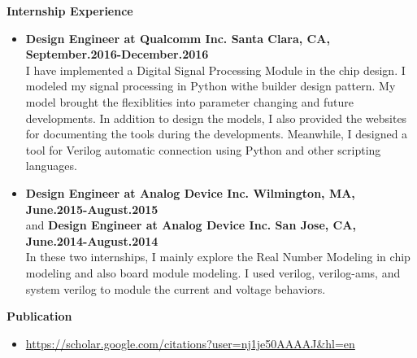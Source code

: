 \documentclass[]{article}
\begin{document}
\noindent \textbf{Internship Experience}
    \begin{itemize}
		\item \textbf{Design Engineer at Qualcomm Inc. Santa Clara, CA, September.2016-December.2016}\\
I have implemented a Digital Signal Processing Module in the chip design. I modeled my signal processing
in Python withe builder design pattern. My model brought the flexiblities into parameter changing and 
future developments. In addition to design the models, I also provided the websites for documenting the
tools during the developments. Meanwhile, I designed a tool for Verilog automatic connection using Python 
and other scripting languages.
        \item \textbf{Design Engineer at Analog Device Inc. Wilmington, MA, June.2015-August.2015}\\
        and \textbf{Design Engineer at Analog Device Inc. San Jose, CA, June.2014-August.2014}\\
In these two internships, I mainly explore the Real Number Modeling in chip modeling and also board 
module modeling. I used verilog, verilog-ams, and system verilog to module the current and voltage 
behaviors. 
    \end{itemize}

% 
\noindent \textbf{Publication}
\begin{itemize}
\item\url{https://scholar.google.com/citations?user=nj1je50AAAAJ&hl=en}
\end{itemize}
%     
% 
% 
% 
% 
\end{document}
